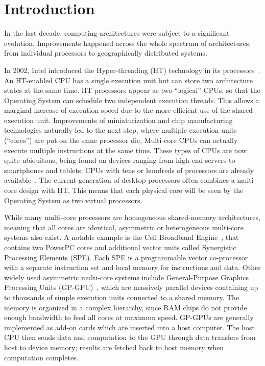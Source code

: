 \documentclass[1p]{elsarticle}
\begin{document}
\section{Introduction}\label{sec:introduction}

In the last decade, computing architectures were subject to a
significant evolution. Improvements happened across the whole spectrum
of architectures, from individual processors to geographically
distributed systems.

In 2002, Intel introduced the Hyper-threading (HT) technology in its
processors~\cite{HT}. An HT-enabled CPU has a single execution unit but
can store two architecture states at the same time. HT processors
appear as two ``logical'' CPUs, so that the Operating System can
schedule two independent execution threads. This allows a marginal
increase of execution speed due to the more efficient use of the
shared execution unit. Improvements of miniaturization and chip
manufacturing technologies naturally led to the next step, where
multiple execution units (``cores'') are put on the same processor
die. Multi-core CPUs can actually execute multiple instructions at the
same time. These types of CPUs are now quite ubiquitous, being found
on devices ranging from high-end servers to smartphones and tablets;
CPUs with tens or hundreds of processors are already
available~\cite{tile64}. The current generation of desktop processors
often combines a multi-core design with HT. This means that each
physical core will be seen by the Operating System as two virtual
processors.

While many multi-core processors are homogeneous shared-memory
architectures, meaning that all cores are identical, asymmetric or
heterogeneous multi-core systems also exist. A notable example is the
Cell Broadband Engine~\cite{cell}, that contains two PowerPC cores and
additional vector units called Synergistic Processing Elements
(SPE). Each SPE is a programmable vector co-processor with a separate
instruction set and local memory for instructions and data. Other
widely used asymmetric multi-core systems include General-Purpose
Graphics Processing Units (GP-GPU)~\cite{gpu}, which are massively parallel
devices containing up to thousands of simple execution units connected
to a shared memory. The memory is organized in a complex hierarchy,
since RAM chips do not provide enough bandwidth to feed all cores at
maximum speed. GP-GPUs are generally implemented as add-on cards which
are inserted into a host computer. The host CPU then sends data and
computation to the GPU through data transfers from host to device
memory; results are fetched back to host memory when computation
completes.
\end{document}
